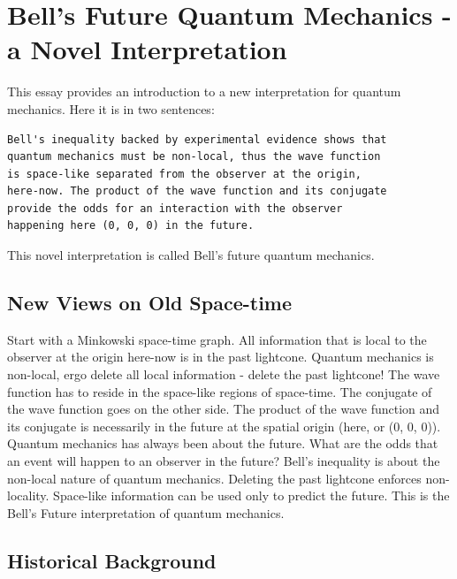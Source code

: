 \hypertarget{bells-future-quantum-mechanics---a-novel-interpretation}{%
\section{Bell's Future Quantum Mechanics - a Novel
Interpretation}\label{bells-future-quantum-mechanics---a-novel-interpretation}}

This essay provides an introduction to a new interpretation for quantum
mechanics. Here it is in two sentences:

\begin{verbatim}
Bell's inequality backed by experimental evidence shows that
quantum mechanics must be non-local, thus the wave function
is space-like separated from the observer at the origin, 
here-now. The product of the wave function and its conjugate
provide the odds for an interaction with the observer 
happening here (0, 0, 0) in the future.
\end{verbatim}

This novel interpretation is called Bell's future quantum mechanics.

\hypertarget{new-views-on-old-space-time}{%
\subsection{New Views on Old
Space-time}\label{new-views-on-old-space-time}}

Start with a Minkowski space-time graph. All information that is local
to the observer at the origin here-now is in the past lightcone. Quantum
mechanics is non-local, ergo delete all local information - delete the
past lightcone! The wave function has to reside in the space-like
regions of space-time. The conjugate of the wave function goes on the
other side. The product of the wave function and its conjugate is
necessarily in the future at the spatial origin (here, or (0, 0, 0)).
Quantum mechanics has always been about the future. What are the odds
that an event will happen to an observer in the future? Bell's
inequality is about the non-local nature of quantum mechanics. Deleting
the past lightcone enforces non-locality. Space-like information can be
used only to predict the future. This is the Bell's Future
interpretation of quantum mechanics.

\hypertarget{historical-background}{%
\subsection{Historical Background}\label{historical-background}}


